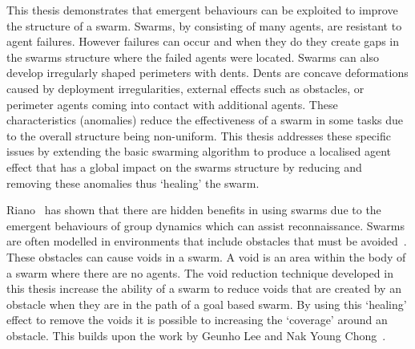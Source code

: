 
This thesis demonstrates that emergent behaviours can be exploited to improve the structure of a swarm. Swarms, by consisting of many agents, are resistant to agent failures. However failures can occur and when they do they create gaps in the swarms structure where the failed agents were located. Swarms can also develop irregularly shaped perimeters with dents. Dents are concave deformations caused by deployment irregularities, external effects such as obstacles, or perimeter agents coming into contact with additional agents. These characteristics (anomalies) reduce the effectiveness of a swarm in some tasks due to the overall structure being non-uniform. This thesis addresses these specific issues by extending the basic swarming algorithm to produce a localised agent effect that has a global impact on the swarms structure by reducing and removing these anomalies thus `healing' the swarm.


Riano~\cite{RM:11} has shown that there are hidden benefits in using swarms due to the emergent behaviours of group dynamics which can assist reconnaissance. Swarms are often modelled in environments that include obstacles that must be avoided~\cite{VG:05, BAB:12, TRI:15}. These obstacles can cause voids in a swarm. A void is an area within the body of a swarm where there are no agents. The void reduction technique developed in this thesis increase the ability of a swarm to reduce voids that are created by an obstacle when they are in the path of a goal based swarm. By using this `healing' effect to remove the voids it is possible to increasing the `coverage' around an obstacle. This builds upon the work by Geunho Lee and Nak Young Chong~\cite{GN:08}. 

